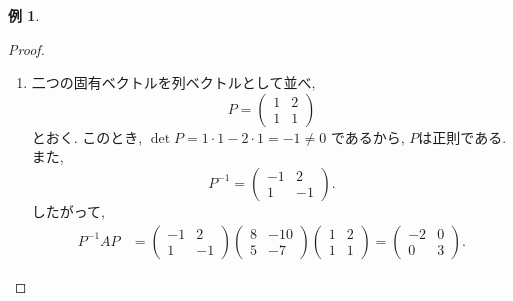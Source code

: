 \documentclass[dvipdfmx,a4paper,11pt]{article} %
\theoremstyle{definition}
\newtheorem{eg}[thm]{例}
\begin{document}
\begin{eg}
\begin{proof}
\begin{enumerate}
次に, 固有値 $\lambda_2=3$ に対応する固有ベクトルを求める.

\[
A
\begin{pmatrix}
x_2\\
y_2
\end{pmatrix}
=
3
\begin{pmatrix}
x_2\\
y_2
\end{pmatrix}
\Rightarrow
(A-3E_2)
\begin{pmatrix}
x_2\\
y_2
\end{pmatrix}
=
\begin{pmatrix}
5&-10\\
5&-10
\end{pmatrix}
\begin{pmatrix}
x_2\\
y_2
\end{pmatrix}
=
\begin{pmatrix}
0\\
0
\end{pmatrix}.
\]
したがって,
\(
x_2-2y_2=0.
\)
よって, 例えば
\(
\begin{pmatrix}
x_2\\
y_2
\end{pmatrix}
=
\begin{pmatrix}
2\\
1
\end{pmatrix}
\)
と取ることができる.

\item[手順3.]
二つの固有ベクトルを列ベクトルとして並べ,
\[
P=
\begin{pmatrix}
1&2\\
1&1
\end{pmatrix}
\]
とおく.
このとき,
\(
\det P=1\cdot 1-2\cdot 1=-1\neq 0
\)
であるから, $P$は正則である. また,
\[
P^{-1}
=
\begin{pmatrix}
-1&2\\
1&-1
\end{pmatrix}.
\]
したがって,
\begin{align*}
P^{-1}AP
&=
\begin{pmatrix}
-1&2\\
1&-1
\end{pmatrix}
\begin{pmatrix}
8&-10\\
5&-7
\end{pmatrix}
\begin{pmatrix}
1&2\\
1&1
\end{pmatrix}=
\begin{pmatrix}
-2&0\\
0&3
\end{pmatrix}.
\end{align*}



\end{enumerate}
\end{proof}
\end{eg}
\end{document}
